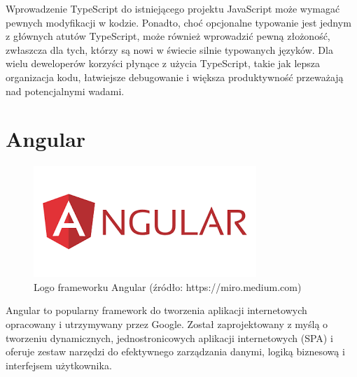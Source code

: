 Wprowadzenie TypeScript do istniejącego projektu JavaScript może wymagać pewnych modyfikacji w kodzie. Ponadto, choć opcjonalne typowanie jest jednym z głównych atutów TypeScript, może również wprowadzić pewną złożoność, zwłaszcza dla tych, którzy są nowi w świecie silnie typowanych języków. Dla wielu deweloperów korzyści płynące z użycia TypeScript, takie jak lepsza organizacja kodu, łatwiejsze debugowanie i większa produktywność przeważają nad potencjalnymi wadami\cite{typescriptSpecs}.

\section{Angular}
\begin{figure}[h]
    \centering
    \includegraphics[width=0.6\linewidth]{./img/angular.png}
    \caption{Logo frameworku Angular (źródło: https://miro.medium.com)}
    \label{fig:Angular}
\end{figure}
Angular to popularny framework do tworzenia aplikacji internetowych opracowany i utrzymywany przez Google. Został zaprojektowany z myślą o tworzeniu dynamicznych, jednostronicowych aplikacji internetowych (SPA) i oferuje zestaw narzędzi do efektywnego zarządzania danymi, logiką biznesową i interfejsem użytkownika.

